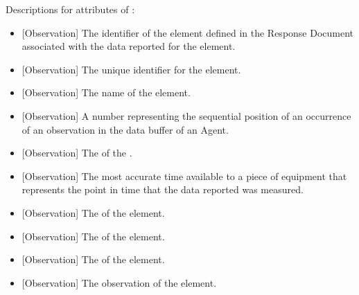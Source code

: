 Descriptions for attributes of :

\begin{itemize}

\item {}[Observation] \newline The identifier of the  element defined in the  \gls{Response Document} associated with the data reported for the  element.

\item {}[Observation] \newline The unique identifier for the  element.

\item {}[Observation] \newline The name of the  element.

\item {}[Observation] \newline A number representing the sequential position of an occurrence of an \gls{observation} in the data buffer of an \gls{Agent}.

\item {}[Observation] \newline The  of the .

\item {}[Observation] \newline The most accurate time available to a piece of equipment that represents the point in time that the data reported was measured.

\item {}[Observation] \newline The  of the  element.

\item {}[Observation] \newline The  of the  element.

\item {}[Observation] \newline The  of the  element.

\item {}[Observation] \newline The \gls{observation} of the  element.
\end{itemize}




